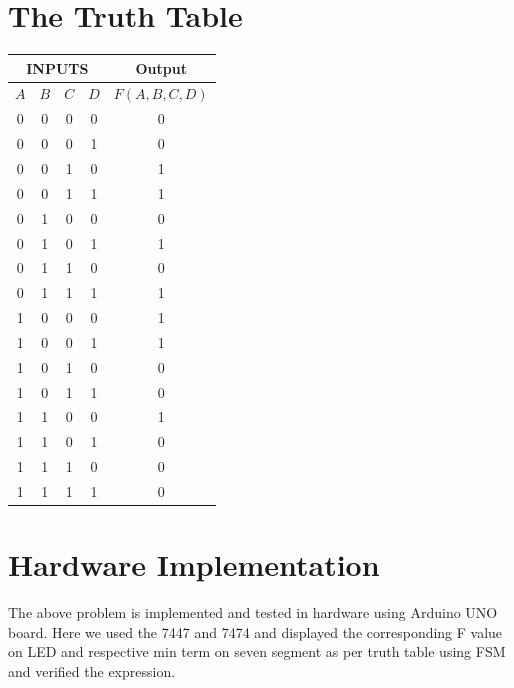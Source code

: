 \documentclass[a4paper,12pt]{article}
\begin{document}
\section*{\textbf{The Truth Table}}
\begin{center}
\begin{tabular}{|c|c|c|c|c|}
\hline
	\multicolumn{4}{|c|}{\textbf{INPUTS}} & \textbf{Output} \\ 
\hline
	$A$ & $B$ & $C$ & $D$ & $F(A,B,C,D)$ \\
\hline
0 & 0 & 0 & 0 & 0 \\ 
0 & 0 & 0 & 1 & 0 \\ 
0 & 0 & 1 & 0 & 1 \\ 
0 & 0 & 1 & 1 & 1 \\ 
0 & 1 & 0 & 0 & 0 \\ 
0 & 1 & 0 & 1 & 1 \\ 
0 & 1 & 1 & 0 & 0 \\ 
0 & 1 & 1 & 1 & 1 \\ 
1 & 0 & 0 & 0 & 1 \\ 
1 & 0 & 0 & 1 & 1 \\ 
1 & 0 & 1 & 0 & 0 \\ 
1 & 0 & 1 & 1 & 0 \\ 
1 & 1 & 0 & 0 & 1 \\ 
1 & 1 & 0 & 1 & 0 \\ 
1 & 1 & 1 & 0 & 0 \\ 
1 & 1 & 1 & 1 & 0 \\ 
\hline
\end{tabular}
\end{center}
\section*{\textbf{Hardware Implementation}}
The above problem is implemented and tested in hardware using Arduino UNO board. Here we used the 7447 and 7474 and displayed the corresponding F value on LED and respective min term on seven segment as per truth table using FSM and verified the expression.
\end{document}
